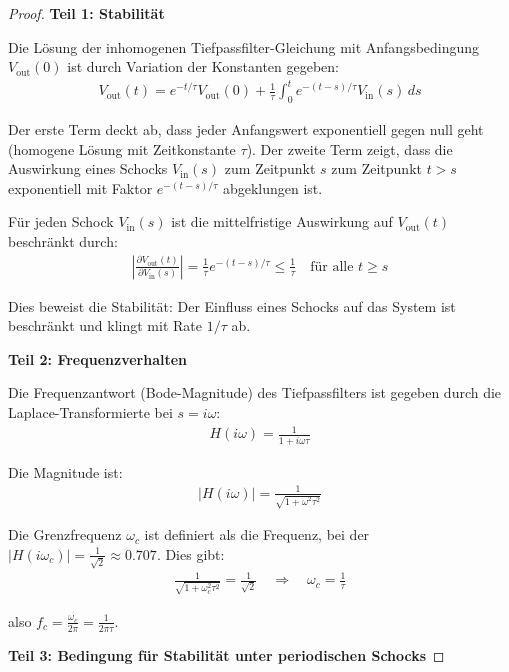\documentclass[a4paper,12pt,twoside]{report}
\theoremstyle{definition}
\begin{document}
\begin{proof}

\textbf{Teil 1: Stabilität}

Die Lösung der inhomogenen Tiefpassfilter-Gleichung mit Anfangsbedingung $V_{\text{out}}(0)$ ist durch Variation der Konstanten gegeben:
\begin{align}
V_{\text{out}}(t) = e^{-t/\tau} V_{\text{out}}(0) + \frac{1}{\tau} \int_0^t e^{-(t-s)/\tau} V_{\text{in}}(s) \, ds
\end{align}

Der erste Term deckt ab, dass jeder Anfangswert exponentiell gegen null geht (homogene Lösung mit Zeitkonstante $\tau$). Der zweite Term zeigt, dass die Auswirkung eines Schocks $V_{\text{in}}(s)$ zum Zeitpunkt $s$ zum Zeitpunkt $t > s$ exponentiell mit Faktor $e^{-(t-s)/\tau}$ abgeklungen ist.

Für jeden Schock $V_{\text{in}}(s)$ ist die mittelfristige Auswirkung auf $V_{\text{out}}(t)$ beschränkt durch:
\begin{align}
\left| \frac{\partial V_{\text{out}}(t)}{\partial V_{\text{in}}(s)} \right| = \frac{1}{\tau} e^{-(t-s)/\tau} \leq \frac{1}{\tau} \quad \text{für alle } t \geq s
\end{align}

Dies beweist die Stabilität: Der Einfluss eines Schocks auf das System ist beschränkt und klingt mit Rate $1/\tau$ ab.

\textbf{Teil 2: Frequenzverhalten}

Die Frequenzantwort (Bode-Magnitude) des Tiefpassfilters ist gegeben durch die Laplace-Transformierte bei $s = i\omega$:
\begin{align}
H(i\omega) = \frac{1}{1 + i\omega\tau}
\end{align}

Die Magnitude ist:
\begin{align}
|H(i\omega)| = \frac{1}{\sqrt{1 + \omega^2\tau^2}}
\end{align}

Die Grenzfrequenz $\omega_c$ ist definiert als die Frequenz, bei der $|H(i\omega_c)| = \frac{1}{\sqrt{2}} \approx 0.707$. Dies gibt:
\begin{align}
\frac{1}{\sqrt{1 + \omega_c^2\tau^2}} = \frac{1}{\sqrt{2}} \quad \Rightarrow \quad \omega_c = \frac{1}{\tau}
\end{align}

also $f_c = \frac{\omega_c}{2\pi} = \frac{1}{2\pi\tau}$.

\textbf{Teil 3: Bedingung für Stabilität unter periodischen Schocks}


\end{proof}
\end{document}

